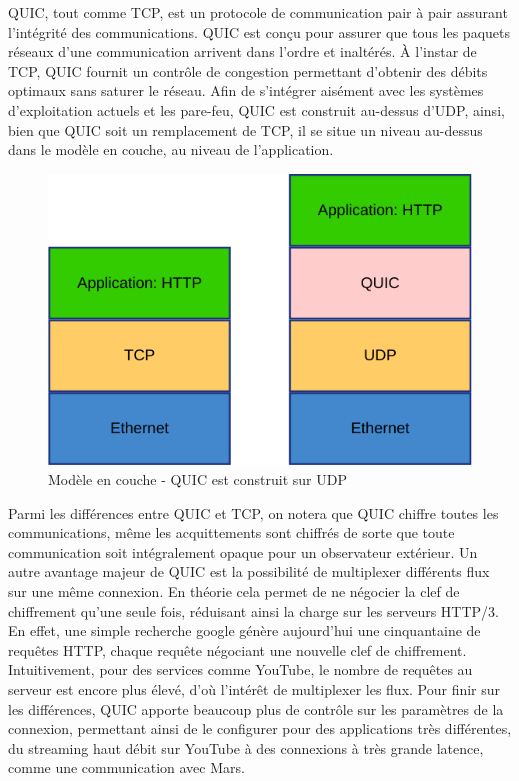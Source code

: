 QUIC, tout comme TCP, est un protocole de communication pair à pair assurant l'intégrité des communications.
QUIC est conçu pour assurer que tous les paquets réseaux d'une communication arrivent dans l'ordre et inaltérés.
À l'instar de TCP, QUIC fournit un contrôle de congestion permettant d'obtenir des débits optimaux sans saturer le réseau.
Afin de s'intégrer aisément avec les systèmes d'exploitation actuels et les pare-feu, QUIC est construit au-dessus d'UDP, ainsi, bien que QUIC soit un remplacement de TCP, il se situe un niveau au-dessus dans le modèle en couche, au niveau de l'application.

\begin{figure}[H]
    \centering
    \includegraphics[height=0.20\textheight]{figures/network_layers.png}
    \caption{Modèle en couche - QUIC est construit sur UDP}
\end{figure}

Parmi les différences entre QUIC et TCP, on notera que QUIC chiffre toutes les communications, même les acquittements sont chiffrés de sorte que toute communication soit intégralement opaque pour un observateur extérieur. Un autre avantage majeur de QUIC est la possibilité de multiplexer différents flux sur une même connexion. En théorie cela permet de ne négocier la clef de chiffrement qu'une seule fois, réduisant ainsi la charge sur les serveurs HTTP/3. En effet, une simple recherche google génère aujourd'hui une cinquantaine de requêtes HTTP, chaque requête négociant une nouvelle clef de chiffrement. Intuitivement, pour des services comme YouTube, le nombre de requêtes au serveur est encore plus élevé, d'où l'intérêt de multiplexer les flux.
Pour finir sur les différences, QUIC apporte beaucoup plus de contrôle sur les paramètres de la connexion, permettant ainsi de le configurer pour des applications très différentes, du streaming haut débit sur YouTube à des connexions à très grande latence, comme une communication avec Mars.

